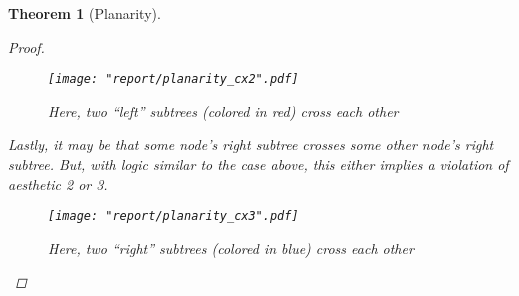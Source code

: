 \documentclass[11pt]{report}
\newtheorem{theorem}{Theorem}[section]
\begin{document}
\begin{theorem}[Planarity]
\begin{proof}
        \begin{figure}[H]
            \centering
            \texttt{[image: "report/planarity\_cx2".pdf]}
            \caption{Here, two ``left'' subtrees (colored in red) cross each other}
        \end{figure}
        
        Lastly, it may be that some node's right subtree crosses some other node's right subtree. But, with logic similar to the case above, this either implies a violation of aesthetic 2 or 3.
        
        \begin{figure}[H]
            \centering
            \texttt{[image: "report/planarity\_cx3".pdf]}
            \caption{Here, two ``right'' subtrees (colored in blue) cross each other}
        \end{figure}
    \end{proof}
\end{theorem}
\end{document}
